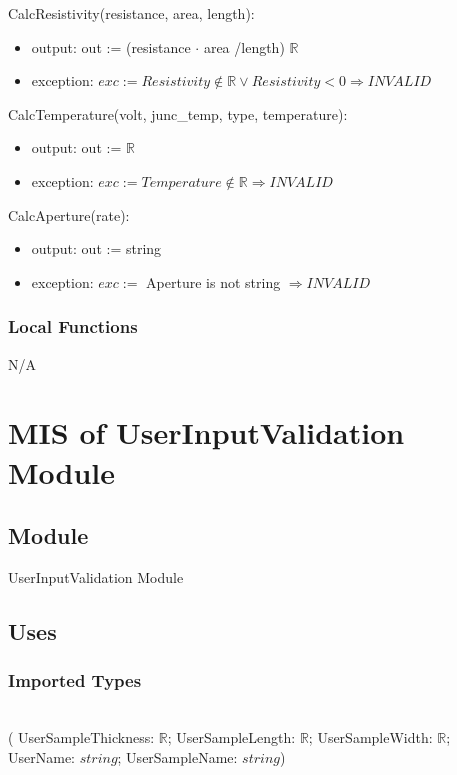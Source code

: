 \documentclass[12pt, titlepage]{article}
\begin{document}
\noindent CalcResistivity(resistance, area, length):
\begin{itemize}
\item output: out := (resistance $\cdot$ area /length) $\mathbb{R}$
\item exception: $exc:= Resistivity \notin \mathbb{R} \lor Resistivity < 0  \Rightarrow INVALID$
\end{itemize}

\noindent CalcTemperature(volt, junc\_temp, type, temperature):
\begin{itemize}
\item output: out := $\mathbb{R}$
\item exception: $exc:= Temperature \notin \mathbb{R}  \Rightarrow INVALID$
\end{itemize}

\noindent CalcAperture(rate):
\begin{itemize}
\item output: out := string
\item exception: $exc:=$ Aperture is not string $\Rightarrow INVALID$
\end{itemize}


\subsubsection{Local Functions}
N/A
\newpage

\section{MIS of UserInputValidation Module} \label{UI} 



\subsection{Module}

UserInputValidation Module

\subsection{Uses}

\subsubsection{Imported Types}

 \\
( UserSampleThickness: $\mathbb{R}$; UserSampleLength: $\mathbb{R}$; UserSampleWidth: $\mathbb{R}$; UserName: $string$; UserSampleName: $string$)
\end{document}

